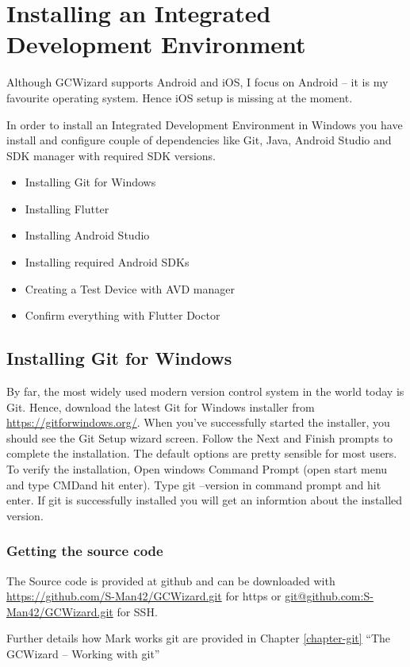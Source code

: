 \chapter{Installing an Integrated Development Environment}

Although GCWizard supports Android and iOS, I focus on Android -- it is my favourite operating system. Hence iOS setup is missing at the moment.

In order to install an Integrated Development Environment in Windows you have install and configure couple of dependencies like Git, Java, Android Studio and SDK manager with required SDK versions.
\begin{itemize}
    \item Installing Git for Windows
    \item Installing Flutter
    \item Installing Android Studio
    \item Installing required Android SDKs
    \item Creating a Test Device with AVD manager
    \item Confirm everything with Flutter Doctor
\end{itemize}


\section{Installing Git for Windows}
By far, the most widely used modern version control system in the world today is Git. Hence, download the latest Git for Windows installer from \url{https://gitforwindows.org/}. When you’ve successfully started the installer, you should see the Git Setup wizard screen. Follow the Next and Finish prompts to complete the installation. The default options are pretty sensible for most users. To verify the installation, Open windows Command Prompt (open start menu and type CMDand hit enter). Type git --version in command prompt and hit enter. If git is successfully installed you will get an informtion about the installed version.

\subsection{Getting the source code}
The Source code is provided at github and can be downloaded with \url{https://github.com/S-Man42/GCWizard.git} for https or \url{git@github.com:S-Man42/GCWizard.git} for SSH.\par
Further details how Mark works git are provided in Chapter \ref{chapter-git} \enquote{The GCWizard -- Working with git}

